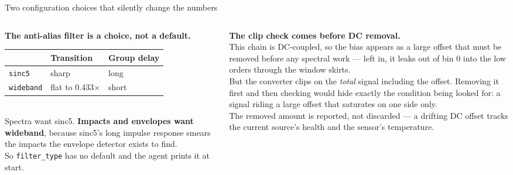 \documentclass[aspectratio=169,10pt]{beamer}
\begin{document}
\begin{frame}{Two configuration choices that silently change the numbers}
  \begin{columns}[T]
    \begin{column}{0.49\textwidth}
      \scriptsize
      \textbf{The anti-alias filter is a choice, not a default.}
      \\[1mm]
      \begin{tabular}{@{}lll@{}}
        \toprule
        & \textbf{Transition} & \textbf{Group delay} \\
        \midrule
        \texttt{sinc5}    & sharp & long \\
        \texttt{wideband} & flat to 0.433$\times$ & short \\
        \bottomrule
      \end{tabular}
      \\[1mm]
      Spectra want sinc5. \textbf{Impacts and envelopes want wideband}, because
      sinc5's long impulse response smears the impacts the envelope detector
      exists to find.
      \\[1mm]
      So \texttt{filter\_type} has no default and the agent prints it at start.
    \end{column}
    \begin{column}{0.49\textwidth}
      \scriptsize
      \textbf{The clip check comes before DC removal.}
      \\[1mm]
      This chain is DC-coupled, so the bias appears as a large offset that must
      be removed before any spectral work --- left in, it leaks out of bin 0
      into the low orders through the window skirts.
      \\[1mm]
      But the converter clips on the \emph{total} signal including the offset.
      Removing it first and then checking would hide exactly the condition
      being looked for: a signal riding a large offset that saturates on one
      side only.
      \\[1mm]
      \color{pdmink2}
      The removed amount is reported, not discarded --- a drifting DC offset
      tracks the current source's health and the sensor's temperature.
    \end{column}
  \end{columns}
\end{frame}
\end{document}
